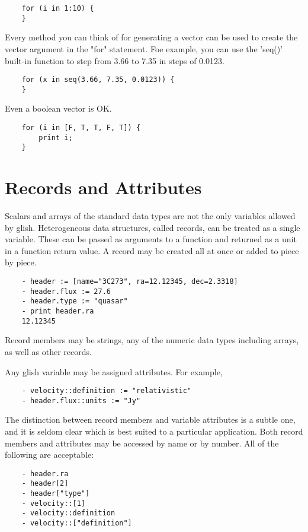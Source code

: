 \begin{verbatim}
	for (i in 1:10) {
	}
\end{verbatim}

Every method you can think of for generating a vector can be used to create
the vector argument in the "for" statement.  Foe example, you can use the
'seq()' built-in function to step from 3.66 to 7.35 in steps of 0.0123.

\begin{verbatim}
	for (x in seq(3.66, 7.35, 0.0123)) {
	}
\end{verbatim}

Even a boolean vector is OK.

\begin{verbatim}
	for (i in [F, T, T, F, T]) {
	    print i;
	}
\end{verbatim}

\section{Records and Attributes}

    Scalars and arrays of the standard data types are not the only
variables allowed by glish.  Heterogeneous data structures, called records,
can be treated as a single variable.  These can be passed as arguments to a
function and returned as a unit in a function return value.  A record may be
created all at once or added to piece by piece.

\begin{verbatim}
	- header := [name="3C273", ra=12.12345, dec=2.3318]
	- header.flux := 27.6
	- header.type := "quasar"
	- print header.ra
	12.12345
\end{verbatim}

    Record members may be strings, any of the numeric data types
including arrays, as well as other records.

    Any glish variable may be assigned attributes.  For example,

\begin{verbatim}
	- velocity::definition := "relativistic"
	- header.flux::units := "Jy"
\end{verbatim}

The distinction between record members and variable attributes is a subtle
one, and it is seldom clear which is best suited to a particular
application.  Both record members and attributes may be accessed by name or
by number.  All of the following are acceptable:

\begin{verbatim}
	- header.ra
	- header[2]
	- header["type"]
	- velocity::[1]
	- velocity::definition
	- velocity::["definition"]
\end{verbatim}

